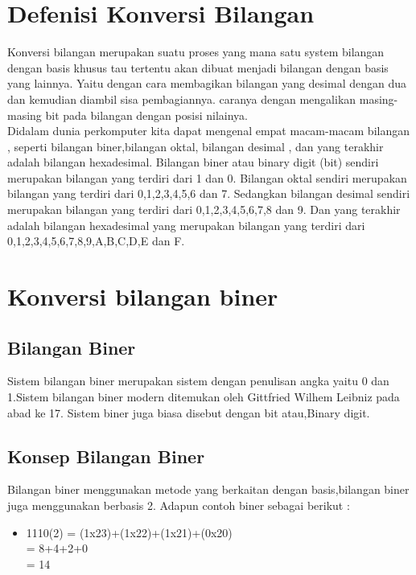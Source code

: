﻿%

\section{Defenisi Konversi Bilangan}
Konversi bilangan merupakan suatu proses yang mana satu system bilangan dengan basis khusus tau tertentu akan dibuat menjadi bilangan dengan basis yang lainnya. 
Yaitu dengan cara membagikan bilangan yang desimal dengan dua dan kemudian diambil sisa pembagiannya.
caranya dengan mengalikan masing-masing bit pada bilangan dengan posisi nilainya.
\\Didalam dunia perkomputer kita dapat mengenal empat macam-macam bilangan , seperti bilangan biner,bilangan oktal, bilangan desimal , dan yang terakhir adalah bilangan hexadesimal. Bilangan biner atau binary digit (bit) sendiri merupakan bilangan yang terdiri dari 1 dan 0. Bilangan oktal sendiri merupakan bilangan yang terdiri dari 0,1,2,3,4,5,6 dan 7.
Sedangkan bilangan desimal sendiri merupakan bilangan yang terdiri dari 0,1,2,3,4,5,6,7,8 dan 9. Dan yang terakhir adalah bilangan hexadesimal yang merupakan bilangan yang terdiri dari 0,1,2,3,4,5,6,7,8,9,A,B,C,D,E dan F.

\section{Konversi bilangan biner}
\subsection{Bilangan Biner}
Sistem bilangan biner merupakan sistem dengan penulisan angka yaitu 0 dan 1.Sistem bilangan biner  modern ditemukan oleh Gittfried Wilhem Leibniz pada abad ke 17. Sistem biner juga biasa disebut dengan bit atau,Binary digit.
\subsection{Konsep Bilangan Biner}
Bilangan biner menggunakan metode yang berkaitan dengan basis,bilangan biner juga menggunakan berbasis 2. Adapun contoh biner sebagai berikut : \\
\begin{itemize}
\item 1110(2) = (1x23)+(1x22)+(1x21)+(0x20)\\
   	  = 8+4+2+0\\
             = 14  
\end{itemize}
